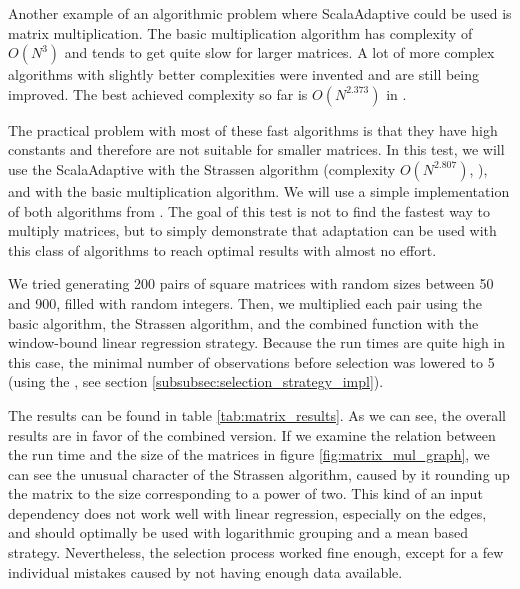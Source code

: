 Another example of an algorithmic problem where ScalaAdaptive could be used is matrix multiplication. The basic multiplication algorithm has complexity of $O(N^3)$ and tends to get quite slow for larger matrices. A lot of more complex algorithms with slightly better complexities were invented and are still being improved. The best achieved complexity so far is $O(N^{2.373})$ in \cite{williams_multiplying_2012}.

The practical problem with most of these fast algorithms is that they have high constants and therefore are not suitable for smaller matrices. In this test, we will use the ScalaAdaptive with the Strassen algorithm (complexity $O(N^{2.807})$, \cite{strassen_gaussian_1969}), and with the basic multiplication algorithm. We will use a simple implementation of both algorithms from \cite{noauthor_jlinalg_nodate}. The goal of this test is not to find the fastest way to multiply matrices, but to simply demonstrate that adaptation can be used with this class of algorithms to reach optimal results with almost no effort.

We tried generating 200 pairs of square matrices with random sizes between 50 and 900, filled with random integers. Then, we multiplied each pair using the basic algorithm, the Strassen algorithm, and the combined function with the window-bound linear regression strategy. Because the run times are quite high in this case, the minimal number of observations before selection was lowered to 5 (using the , see section \ref{subsubsec:selection_strategy_impl}). 

The results can be found in table \ref{tab:matrix_results}. As we can see, the overall results are in favor of the combined version. If we examine the relation between the run time and the size of the matrices in figure \ref{fig:matrix_mul_graph}, we can see the unusual character of the Strassen algorithm, caused by it rounding up the matrix to the size corresponding to a power of two. This kind of an input dependency does not work well with linear regression, especially on the edges, and should optimally be used with logarithmic grouping and a mean based strategy. Nevertheless, the selection process worked fine enough, except for a few individual mistakes caused by not having enough data available.

